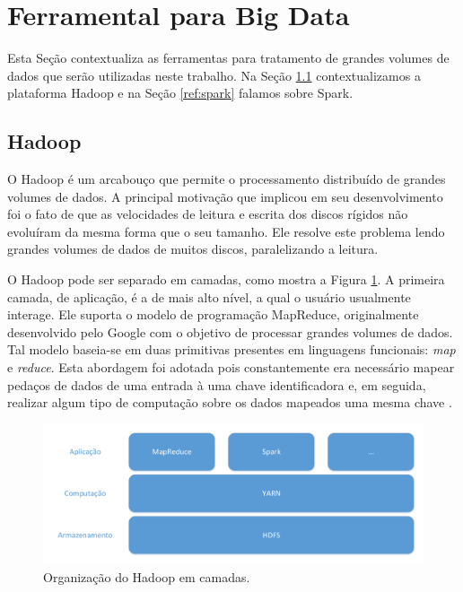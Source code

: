 \section{Ferramental para Big Data}

Esta Seção contextualiza as ferramentas para tratamento de grandes volumes de 
dados que serão utilizadas neste trabalho. Na Seção \ref{ref:hadoop} 
contextualizamos a plataforma Hadoop e na Seção \ref{ref:spark} falamos sobre 
Spark.

\subsection{Hadoop} \label{ref:hadoop}

O Hadoop é um arcabouço que permite o processamento distribuído de 
grandes volumes de dados. A principal motivação que implicou em seu 
desenvolvimento foi o fato de que as velocidades de leitura e escrita dos 
discos rígidos não evoluíram da mesma forma que o seu tamanho. Ele resolve este 
problema lendo grandes volumes de dados de muitos discos, paralelizando a 
leitura.

O Hadoop pode ser separado em camadas, como mostra a Figura \ref{fig:hadoop}. A 
primeira camada, de aplicação,  é a de mais alto nível, a qual o usuário 
usualmente interage. Ele suporta o modelo de programação MapReduce, 
originalmente desenvolvido pelo Google com o objetivo de processar grandes 
volumes de dados. Tal modelo baseia-se em duas primitivas presentes em 
linguagens funcionais: \emph{map} e \emph{reduce}. Esta abordagem  foi adotada 
pois constantemente era necessário mapear pedaços de dados de uma entrada à 
uma chave identificadora e, em seguida, realizar algum tipo de 
computação sobre os dados mapeados uma mesma chave \cite{ref:mapreduce}.

\begin{figure}[H]
 \centerline{\includegraphics[width=1\textwidth]{./img/hadoop-layers.pdf}}
 \caption{Organização do Hadoop em camadas.}
 \label{fig:hadoop}
\end{figure}

